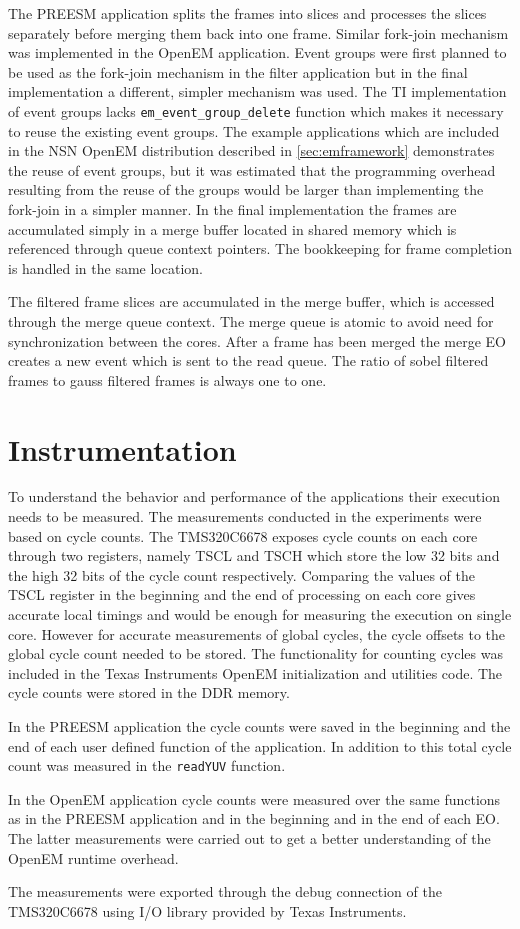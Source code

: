 The PREESM application splits the frames into slices and processes the slices separately before merging them back into one frame. Similar fork-join mechanism was implemented in the OpenEM application. Event groups were first planned to be used as the fork-join mechanism in the filter application but in the final implementation a different, simpler mechanism was used. The TI implementation of event groups lacks \texttt{em\_event\_group\_delete} function which makes it necessary to reuse the existing event groups. The example applications which are included in the NSN OpenEM distribution described in \ref{sec:emframework} demonstrates the reuse of event groups, but it was estimated that the programming overhead resulting from the reuse of the groups would be larger than implementing the fork-join in a simpler manner. In the final implementation the frames are accumulated simply in a merge buffer located in shared memory which is referenced through queue context pointers. The bookkeeping for frame completion is handled in the same location.

The filtered frame slices are accumulated in the merge buffer, which is accessed through the merge queue context. The merge queue is atomic to avoid need for synchronization between the cores. After a frame has been merged the merge EO creates a new event which is sent to the read queue. The ratio of sobel filtered frames to gauss filtered frames is always one to one.

\section{Instrumentation}
\label{sec:instrumentation}
To understand the behavior and performance of the applications their execution needs to be measured. The measurements conducted in the experiments were based on cycle counts. The TMS320C6678 exposes cycle counts on each core through two registers, namely TSCL and TSCH which store the low 32 bits and the high 32 bits of the cycle count respectively. Comparing the values of the TSCL register in the beginning and the end of processing on each core gives accurate local timings and would be enough for measuring the execution on single core. However for accurate measurements of global cycles, the cycle offsets to the global cycle count needed to be stored. The functionality for counting cycles was included in the Texas Instruments OpenEM initialization and utilities code. The cycle counts were stored in the DDR memory.

In the PREESM application the cycle counts were saved in the beginning and the end of each user defined function of the application. In addition to this total cycle count was measured in the \texttt{readYUV} function.  

In the OpenEM application cycle counts were measured over the same functions as in the PREESM application and in the beginning and in the end of each EO. The latter measurements were carried out to get a better understanding of the OpenEM runtime overhead.

The measurements were exported through the debug connection of the TMS320C6678 using I/O library provided by Texas Instruments.
